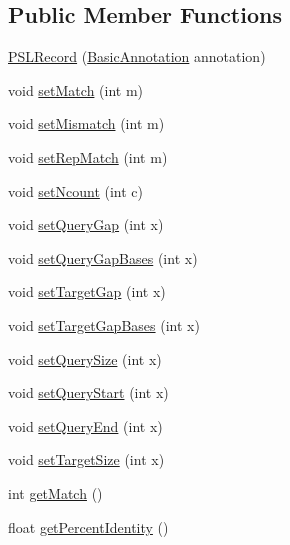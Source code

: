 \subsection*{Public Member Functions}
\begin{DoxyCompactItemize}
\item 
\hyperlink{classumms_1_1core_1_1annotation_1_1_p_s_l_record_abb43b9e51feefb1fa68793a8227dc609}{P\+S\+L\+Record} (\hyperlink{classumms_1_1core_1_1annotation_1_1_basic_annotation}{Basic\+Annotation} annotation)
\item 
void \hyperlink{classumms_1_1core_1_1annotation_1_1_p_s_l_record_ac6b63ce6fb4d1ca38ec813bcf538de03}{set\+Match} (int m)
\item 
void \hyperlink{classumms_1_1core_1_1annotation_1_1_p_s_l_record_a532509325fab0bf13280c7ef76664a5f}{set\+Mismatch} (int m)
\item 
void \hyperlink{classumms_1_1core_1_1annotation_1_1_p_s_l_record_a971171293a2eb9b32d1586bc994cdea7}{set\+Rep\+Match} (int m)
\item 
void \hyperlink{classumms_1_1core_1_1annotation_1_1_p_s_l_record_a1cff0c12ece80b762281ec6818a5f245}{set\+Ncount} (int c)
\item 
void \hyperlink{classumms_1_1core_1_1annotation_1_1_p_s_l_record_a1006f6653f527786d2c9e80641b74eff}{set\+Query\+Gap} (int x)
\item 
void \hyperlink{classumms_1_1core_1_1annotation_1_1_p_s_l_record_a44088687e7bab19bfa71d6004b4890c0}{set\+Query\+Gap\+Bases} (int x)
\item 
void \hyperlink{classumms_1_1core_1_1annotation_1_1_p_s_l_record_ad4f98ee3215b72ce55d25d849649ef05}{set\+Target\+Gap} (int x)
\item 
void \hyperlink{classumms_1_1core_1_1annotation_1_1_p_s_l_record_a6651dc11eecfdf92d2cb8ad5449bc628}{set\+Target\+Gap\+Bases} (int x)
\item 
void \hyperlink{classumms_1_1core_1_1annotation_1_1_p_s_l_record_a51fd82202e1ee98cf85d0aa88678e768}{set\+Query\+Size} (int x)
\item 
void \hyperlink{classumms_1_1core_1_1annotation_1_1_p_s_l_record_a8ddc23d04833743e8fbd3c6584df16cd}{set\+Query\+Start} (int x)
\item 
void \hyperlink{classumms_1_1core_1_1annotation_1_1_p_s_l_record_a571002b83eb3837b3f7b3cad75ad0c6d}{set\+Query\+End} (int x)
\item 
void \hyperlink{classumms_1_1core_1_1annotation_1_1_p_s_l_record_a8f06cee2b9504e36117fd453cd09300d}{set\+Target\+Size} (int x)
\item 
int \hyperlink{classumms_1_1core_1_1annotation_1_1_p_s_l_record_a94f1a2fcb6fec040cc1dbaf7e5e42c1e}{get\+Match} ()
\item 
float \hyperlink{classumms_1_1core_1_1annotation_1_1_p_s_l_record_a23ee2735be5903fd7a082554d1bf6edf}{get\+Percent\+Identity} ()
\end{DoxyCompactItemize}
